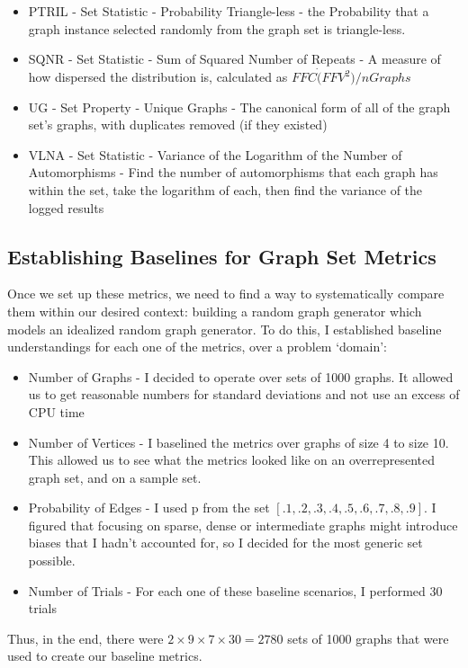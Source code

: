 \begin{itemize}
\item{PTRIL - Set Statistic - Probability Triangle-less - the Probability that a graph instance selected randomly from the graph set is triangle-less.}
\item{SQNR - Set Statistic - Sum of Squared Number of Repeats - A measure of how dispersed the distribution is, calculated as $FFC \dot (FFV^2) / nGraphs$}
\item{UG - Set Property - Unique Graphs - The canonical form of all of the graph set's graphs, with duplicates removed (if they existed)}
\item{VLNA - Set Statistic - Variance of the Logarithm of the Number of Automorphisms - Find the number of automorphisms that each graph has within the set, take the logarithm of each, then find the variance of the logged results}
\end{itemize}

\subsection{Establishing Baselines for Graph Set Metrics}

Once we set up these metrics, we need to find a way to systematically compare them within our desired context: building a random graph generator which models an idealized random graph generator.
To do this, I established baseline understandings for each one of the metrics, over a problem `domain':
\begin{itemize}
\item{Number of Graphs - I decided to operate over sets of 1000 graphs.  It allowed us to get reasonable numbers for standard deviations and not use an excess of CPU time}
\item{Number of Vertices - I baselined the metrics over graphs of size 4 to size 10.  This allowed us to see what the metrics looked like on an overrepresented graph set, and on a sample set.}
\item{Probability of Edges - I used p from the set $[.1, .2, .3, .4, .5, .6, .7, .8, .9]$. I figured that focusing on sparse, dense or intermediate graphs might introduce biases that I hadn't accounted for, so I decided for the most generic set possible.}
\item{Number of Trials - For each one of these baseline scenarios, I performed 30 trials}
\end{itemize}

Thus, in the end, there were $2 \times 9 \times 7 \times 30 = 2780$ sets of 1000 graphs that were used to create our baseline metrics.

